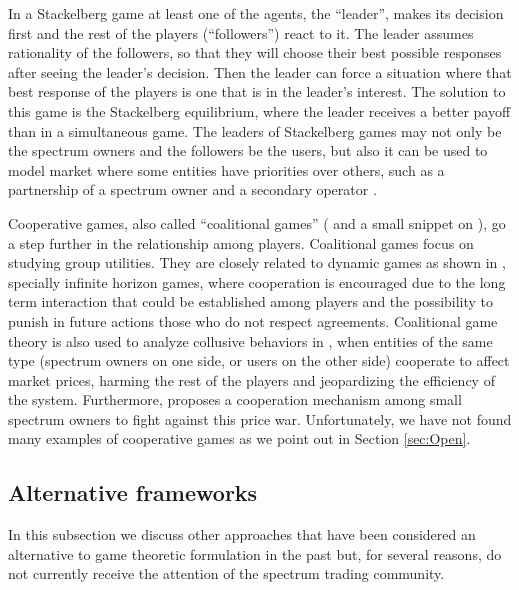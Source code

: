 In a Stackelberg game \cite{ref:Simeone2008,ref:Zhang2009,ref:Yi2010,ref:Vazquez2010,ref:Duan2010_Cog,ref:Duan2011_Inves,ref:Zhu2012_Dyn,ref:Canzian2013} at least one of the agents, the ``leader'',  makes its decision first and the rest of the players (``followers'') react to it. 
The leader assumes rationality of the followers, so that they will choose their best possible responses after seeing the leader's decision.
Then the leader can force a situation where that best response of the players is one that is in the leader's interest. 
The solution to this game is the Stackelberg equilibrium, where the leader receives a better payoff than in a simultaneous game. 
The leaders of Stackelberg games may not only be the spectrum owners and the followers be the users, but also it can be used to model market where some entities have priorities over others, such as a partnership of a spectrum owner and a secondary operator \cite{ref:Zhu2012_Dyn}. 

Cooperative games, also called ``coalitional games'' (\cite{ref:Li2011} and a small snippet on \cite{ref:Xing2007}), go a step further in the relationship among players. 
Coalitional games focus on studying group utilities. 
They are closely related to dynamic games as shown in \cite{ref:Niyato2008_Comp}, specially infinite horizon games, where cooperation is encouraged due to the long term interaction that could be established among players and the possibility to punish in future actions those who do not respect agreements.
Coalitional game theory is also used to analyze collusive behaviors in \cite{ref:Ji2008,ref:Tan2010,ref:Sengupta2007}, when entities of the same type (spectrum owners on one side, or users on the other side) cooperate to affect market prices, harming the rest of the players and jeopardizing the efficiency of the system. 
Furthermore, \cite{ref:Tan2010} proposes a cooperation mechanism among small spectrum owners to fight against this price war. 
Unfortunately, we have not found many examples of cooperative games as we point out in Section \ref{sec:Open}.

\subsection{Alternative frameworks}\label{sec:Deprecated}
In this subsection we discuss other approaches that have been considered an alternative to game theoretic formulation in the past but, for several reasons, do not currently receive the attention of the spectrum trading community. 
